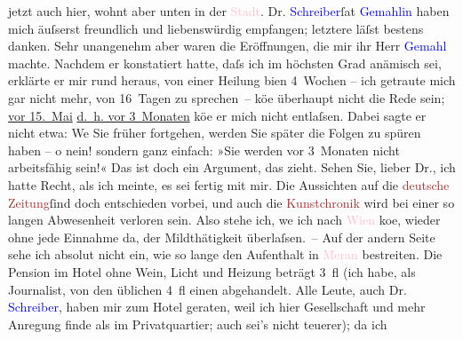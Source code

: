                     jetzt auch hier, wohnt aber unten in der \textcolor{pink}{Stadt}{}.\pend
           \pstart
           Dr. \textcolor{blue}{Schreiber}{}\ledrightnote{\textcolor{blue}{Joseph Schreiber}}{ }ſa{\geminationm}t \textcolor{blue}{Gemahlin}{} haben mich
                    äuſserst freundlich und liebenswürdig empfangen; letztere läſst bestens danken.
                    Sehr unangenehm aber waren die Eröffnungen, die mir ihr Herr \textcolor{blue}{Gemahl}{} machte. Nachdem er konstatiert
                    hatte, daſs ich im höchsten Grad anämisch sei, erklärte er mir rund heraus, von
                    einer Heilung bi{\geminationn}en 4 Wochen – ich getraute mich
                    gar nicht mehr, von 16 Tagen zu sprechen – kö{\geminationn}e
                    überhaupt nicht die Rede sein; \uline{vor
                            15. Mai}{ }{\pb}\uline{d. h. vor 3 Monaten} kö{\geminationn}e er mich nicht entlaſsen. Dabei sagte er nicht
                    etwa: We{\geminationn} Sie früher fortgehen, werden Sie später
                    die Folgen zu spüren haben – o nein! sondern ganz einfach: »Sie werden vor
                    3 Monaten nicht arbeitsfähig sein!« Das ist doch ein Argument, das zieht.\pend
           \pstart
           Sehen Sie, lieber Dr., ich hatte Recht, als ich meinte, es sei fertig mit mir.
                    Die Aussichten auf die \textcolor{brown}{deutsche Zeitung}{}\ledrightnote{\textcolor{brown}{Deutsche Zeitung}}{ }ſind doch entschieden vorbei, und auch die \textcolor{brown}{Kunstchronik}{}\ledrightnote{\textcolor{brown}{Allgemeine Kunst-Chronik}} wird bei einer so langen
                    Abwesenheit verloren sein. Also stehe ich, we{\geminationn} ich
                    nach \textcolor{pink}{Wien}{}\ledrightnote{\textcolor{pink}{Wien}} ko{\geminationm}e,
                    wieder ohne jede Einnahme da, der Mildthätigkeit überlaſsen. – Auf der andern
                    Seite sehe ich absolut nicht ein, wie so lange den Aufenthalt in \textcolor{pink}{Meran}{}\ledrightnote{\textcolor{pink}{Meran}} bestreiten. Die Pension im Hotel ohne
                    Wein, Licht und Heizung beträgt 3 fl (ich habe, als Journalist, von den üblichen
                    4 fl einen abgehandelt. Alle Leute, auch Dr. \textcolor{blue}{Schreiber}{}\ledrightnote{\textcolor{blue}{Joseph Schreiber}}, haben mir zum Hotel geraten, weil ich hier Gesellschaft und
                    mehr Anregung finde als im Privatquartier; auch sei’s nicht teuerer); da ich
